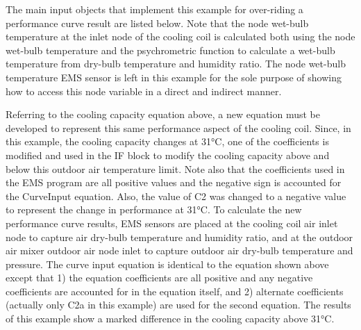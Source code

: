 The main input objects that implement this example for over-riding a performance curve result are listed below. Note that the node wet-bulb temperature at the inlet node of the cooling coil is calculated both using the node wet-bulb temperature and the psychrometric function to calculate a wet-bulb temperature from dry-bulb temperature and humidity ratio. The node wet-bulb temperature EMS sensor is left in this example for the sole purpose of showing how to access this node variable in a direct and indirect manner.

Referring to the cooling capacity equation above, a new equation must be developed to represent this same performance aspect of the cooling coil. Since, in this example, the cooling capacity changes at 31°C, one of the coefficients is modified and used in the IF block to modify the cooling capacity above and below this outdoor air temperature limit. Note also that the coefficients used in the EMS program are all positive values and the negative sign is accounted for the CurveInput equation. Also, the value of C2 was changed to a negative value to represent the change in performance at 31°C. To calculate the new performance curve results, EMS sensors are placed at the cooling coil air inlet node to capture air dry-bulb temperature and humidity ratio, and at the outdoor air mixer outdoor air node inlet to capture outdoor air dry-bulb temperature and pressure. The curve input equation is identical to the equation shown above except that 1) the equation coefficients are all positive and any negative coefficients are accounted for in the equation itself, and 2) alternate coefficients (actually only C2a in this example) are used for the second equation. The results of this example show a marked difference in the cooling capacity above 31°C.

